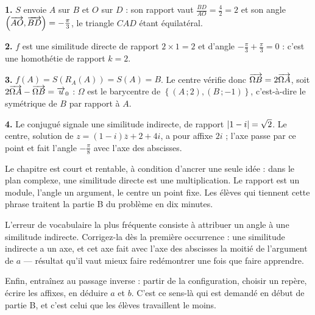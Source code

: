 \begin{corrige}
\textbf{1.} $S$ envoie $A$ sur $B$ et $O$ sur $D$ : son rapport vaut
$\frac{BD}{AO} = \frac{4}{2} = 2$ et son angle
$\left(\overrightarrow{AO},\overrightarrow{BD}\right) = -\frac{\pi}{3}$, le triangle $CAD$ étant
équilatéral.

\textbf{2.} $f$ est une similitude directe de rapport $2 \times 1 = 2$ et
d'angle $-\frac{\pi}{3}+\frac{\pi}{3} = 0$ : c'est une homothétie de rapport
$k = 2$.

\textbf{3.} $f(A) = S\left(R_{A}(A)\right) = S(A) = B$. Le centre vérifie
donc $\overrightarrow{\Omega B} = 2\overrightarrow{\Omega A}$, soit
$2\overrightarrow{\Omega A}-\overrightarrow{\Omega B} = \overrightarrow{u}_{0}$ : $\Omega$ est le barycentre
de $\left\{(A\,;2),(B\,;-1)\right\}$, c'est-à-dire le symétrique de $B$ par
rapport à $A$.

\textbf{4.} Le conjugué signale une similitude indirecte, de rapport
$\left|1-i\right| = \sqrt2$. Le centre, solution de $z = (1-i)\overline z+2+4i$, a
pour affixe $2i$ ; l'axe passe par ce point et fait l'angle
$-\frac{\pi}{8}$ avec l'axe des abscisses.
\end{corrige}

\begin{notepourlaclasse}
Le chapitre est court et rentable, à condition d'ancrer une seule idée : dans
le plan complexe, une similitude directe est une multiplication. Le rapport
est un module, l'angle un argument, le centre un point fixe. Les élèves qui
tiennent cette phrase traitent la partie B du problème en dix minutes.

L'erreur de vocabulaire la plus fréquente consiste à attribuer un angle à une
similitude indirecte. Corrigez-la dès la première occurrence : une similitude
indirecte a un axe, et cet axe fait avec l'axe des abscisses la moitié de
l'argument de $a$ — résultat qu'il vaut mieux faire redémontrer une fois que
faire apprendre.

Enfin, entraînez au passage inverse : partir de la configuration, choisir un
repère, écrire les affixes, en déduire $a$ et $b$. C'est ce sens-là qui est
demandé en début de partie B, et c'est celui que les élèves travaillent le
moins.
\end{notepourlaclasse}
